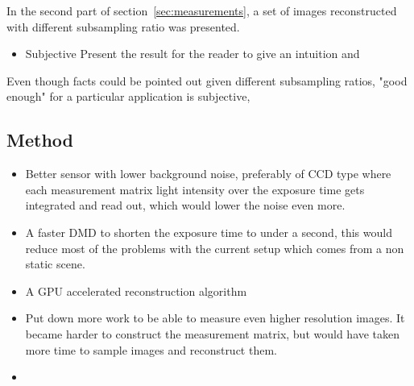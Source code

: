 In the second part of section~\ref{sec:measurements}, a set of images reconstructed with different subsampling ratio was presented. 

\begin{itemize}
\item Subjective 
\just Present the result for the reader to give an intuition and 
\end{itemize}


 Even though facts could be pointed out given different subsampling ratios, "good enough" for a particular application is subjective,  


\subsection{Method} %



\begin{itemize}
\item Better sensor with lower background noise, preferably of CCD type where each measurement matrix light intensity over the exposure time gets integrated and read out, which would lower the noise even more.

\item A faster DMD to shorten the exposure time to under a second, this would reduce most of the problems with the current setup which comes from a non static scene.

\item A GPU accelerated reconstruction algorithm

\item Put down more work to be able to measure even higher resolution images. It became harder to construct the measurement matrix, but would have taken more time to sample images and reconstruct them.

\item 


\end{itemize}

